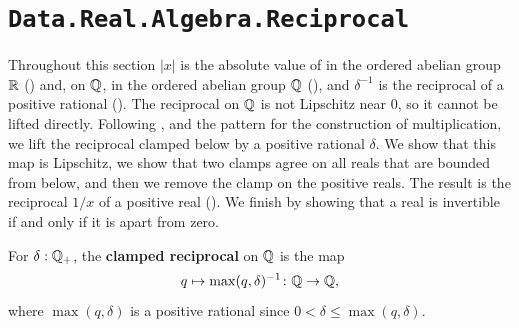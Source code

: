 \section{\texttt{Data.Real.Algebra.Reciprocal}}

Throughout this section $\lvert x \rvert$ is the absolute value of  in the ordered abelian group $\mathbb{R}$ () and, on $\mathbb{Q}$, in the ordered abelian group $\mathbb{Q}$ (), and $\delta^{-1}$ is the reciprocal of a positive rational (). The reciprocal on $\mathbb{Q}$ is not Lipschitz near $0$, so it cannot be lifted directly. Following \textcite[\S~4.3]{gilbert2017}, and the pattern for the construction of multiplication, we lift the reciprocal clamped below by a positive rational $\delta$. We show that this map is Lipschitz, we show that two clamps agree on all reals that are bounded from below, and then we remove the clamp on the positive reals. The result is the reciprocal $1/x$ of a positive real (). We finish by showing that a real is invertible if and only if it is apart from zero.

\begin{definition}
  \label{boundedRecipQ}
  For $\delta : \mathbb{Q}_{+}$, the \textbf{clamped reciprocal} on $\mathbb{Q}$ is the map
  \[
    q \mapsto \max(q, \delta)^{-1} \colon \mathbb{Q} \to \mathbb{Q},
  \]
  where $\max(q, \delta)$ is a positive rational since $0 < \delta \le \max(q, \delta)$.
\end{definition}

